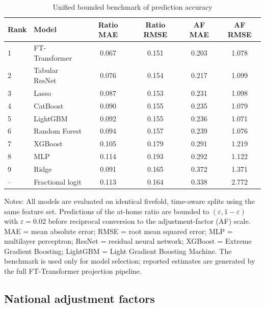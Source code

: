 \documentclass[preprint,12pt,authoryear]{elsarticle}
\begin{document}
\begin{table}[htbp]
\centering
\small
\begin{threeparttable}
\caption{Unified bounded benchmark of prediction accuracy}
\label{tab:benchmark}
\begin{tabular*}{\textwidth}{@{\extracolsep{\fill}} l l cccc @{}}
\toprule
Rank & Model & Ratio MAE & Ratio RMSE & AF MAE & AF RMSE \\
\midrule
1 & FT-Transformer & 0.067 & 0.151 & 0.203 & 1.078 \\
2 & Tabular ResNet & 0.076 & 0.154 & 0.217 & 1.099 \\
3 & Lasso          & 0.087 & 0.153 & 0.231 & 1.098 \\
4 & CatBoost       & 0.090 & 0.155 & 0.235 & 1.079 \\
5 & LightGBM       & 0.092 & 0.155 & 0.236 & 1.071 \\
6 & Random Forest  & 0.094 & 0.157 & 0.239 & 1.076 \\
7 & XGBoost        & 0.105 & 0.179 & 0.291 & 1.219 \\
8 & MLP            & 0.114 & 0.193 & 0.292 & 1.122 \\
9 & Ridge          & 0.091 & 0.165 & 0.372 & 1.371 \\
\addlinespace
-- & Fractional logit & 0.113 & 0.164 & 0.338 & 2.772 \\
\bottomrule
\end{tabular*}
\begin{tablenotes}[flushleft]
\scriptsize
\item Notes: All models are evaluated on identical fivefold, time-aware splits using the same feature set. Predictions of the at-home ratio are bounded to $(\varepsilon,1-\varepsilon)$ with $\varepsilon=0.02$ before reciprocal conversion to the adjustment-factor (AF) scale. MAE = mean absolute error; RMSE = root mean squared error; MLP = multilayer perceptron; ResNet = residual neural network; XGBoost = Extreme Gradient Boosting; LightGBM = Light Gradient Boosting Machine. The benchmark is used only for model selection; reported estimates are generated by the full FT-Transformer projection pipeline.
\end{tablenotes}
\end{threeparttable}
\end{table}

\subsection{National adjustment factors}
\label{subsec:national}
\end{document}
